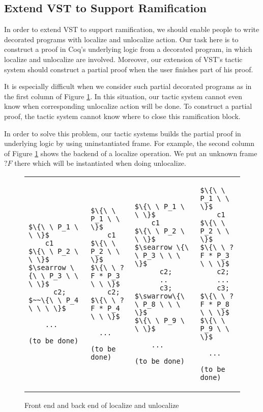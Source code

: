 \subsection{Extend VST to Support Ramification}

In order to extend VST to support ramification, we should enable people to write decorated programs with localize and unlocalize action. Our task here is to construct a proof in Coq's underlying logic from a decorated program, in which localize and unlocalize are involved. Moreover, our extension of VST's tactic system should construct a partial proof when the user finishes part of his proof.

It is especially difficult when we consider such partial decorated programs as in the first column of Figure \ref{figure:backend}. In this situation, our tactic system cannot even know when corresponding unlocalize action will be done. To construct a partial proof, the tactic system cannot know where to close this ramification block.

In order to solve this problem, our tactic systems builds the partial proof in underlying logic by using uninstantiated frame. For example, the second column of Figure \ref{figure:backend} shows the backend of a localize operation. We put an unknown frame $?F$ there which will be instantiated when doing unlocalize.

\begin{figure}[h]
\begin{tabular}{l | l | l | l}
\begin{lstlisting}
$\{\ \ P_1 \ \ \}$
    c1
$\{\ \ P_2 \ \ \}$
$\searrow \{\ \ P_3 \ \ \ \}$
      c2;
$~~\{\ \ P_4 \ \ \ \}$

    ...

(to be done)

\end{lstlisting} &
\begin{lstlisting}
$\{\ \ P_1 \ \ \}$
    c1
$\{\ \ P_2 \ \ \}$
$\{\ \ ?F * P_3 \ \ \}$
    c2;
$\{\ \ ?F * P_4 \ \ \}$

  ...

(to be done)

\end{lstlisting} &
\begin{lstlisting}
$\{\ \ P_1 \ \ \}$
    c1
$\{\ \ P_2 \ \ \}$
$\searrow \{\ \ P_3 \ \ \ \}$
      c2;
      ..
      c3;
$\swarrow\{\ \ P_8 \ \ \ \}$
$\{\ \ P_9 \ \ \}$

    ...

(to be done)
\end{lstlisting} &
\begin{lstlisting}
$\{\ \ P_1 \ \ \}$
    c1
$\{\ \ P_2 \ \ \}$
$\{\ \ ?F * P_3 \ \ \}$
    c2;
    ...
    c3;
$\{\ \ ?F * P_8 \ \ \}$
$\{\ \ P_9 \ \ \}$

  ...

(to be done)
\end{lstlisting}
\end{tabular}
\caption{Front end and back end of localize and unlocalize}
\label{figure:backend}
\end{figure}

